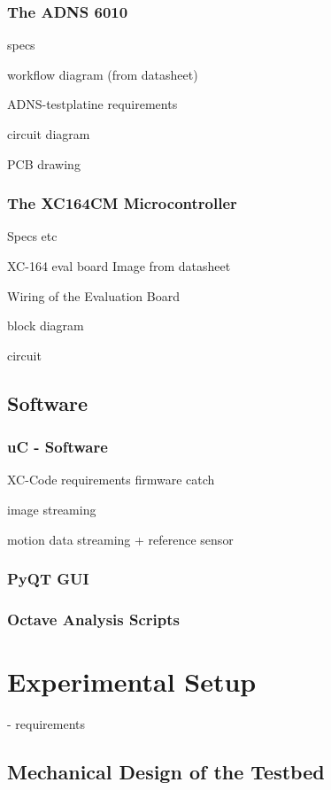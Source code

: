 \documentclass[12pt,a4paper]{article}
\begin{document}
\subsubsection{The ADNS 6010}

specs

workflow diagram (from datasheet)

ADNS-testplatine
  requirements

  circuit diagram

  PCB drawing

\subsubsection{The XC164CM Microcontroller}

Specs etc

XC-164 eval board 
  Image from datasheet

Wiring of the Evaluation Board

  block diagram

  circuit

\subsection{Software}

\subsubsection{uC - Software}

  XC-Code
    requirements
    firmware catch

    image streaming

    motion data streaming
      + reference sensor

\subsubsection{PyQT GUI}

\subsubsection{Octave Analysis Scripts}

\section{Experimental Setup}

- requirements

\subsection{Mechanical Design of the Testbed}
\end{document}

